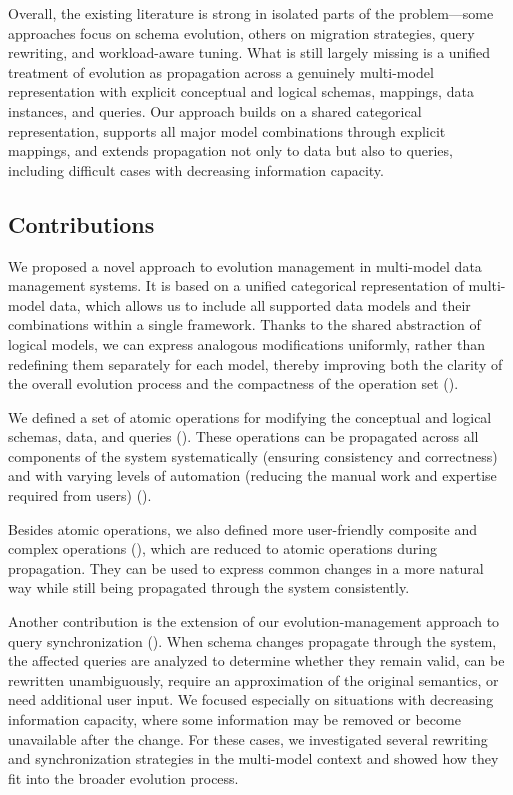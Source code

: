 Overall, the existing literature is strong in isolated parts of the problem---some approaches focus on schema evolution, others on migration strategies, query rewriting, and workload-aware tuning. What is still largely missing is a unified treatment of evolution as propagation across a genuinely multi-model representation with explicit conceptual and logical schemas, mappings, data instances, and queries. Our approach builds on a shared categorical representation, supports all major model combinations through explicit mappings, and extends propagation not only to data but also to queries, including difficult cases with decreasing information capacity.

\subsection{Contributions}

We proposed a novel approach to evolution management in multi-model data management systems. It is based on a unified categorical representation of multi-model data, which allows us to include all supported data models and their combinations within a single framework. Thanks to the shared abstraction of logical models, we can express analogous modifications uniformly, rather than redefining them separately for each model, thereby improving both the clarity of the overall evolution process and the compactness of the operation set ().

We defined a set of atomic operations for modifying the conceptual and logical schemas, data, and queries (). These operations can be propagated across all components of the system systematically (ensuring consistency and correctness) and with varying levels of automation (reducing the manual work and expertise required from users) ().

Besides atomic operations, we also defined more user-friendly composite and complex operations (), which are reduced to atomic operations during propagation. They can be used to express common changes in a more natural way while still being propagated through the system consistently.

Another contribution is the extension of our evolution-management approach to query synchronization (). When schema changes propagate through the system, the affected queries are analyzed to determine whether they remain valid, can be rewritten unambiguously, require an approximation of the original semantics, or need additional user input. We focused especially on situations with decreasing information capacity, where some information may be removed or become unavailable after the change. For these cases, we investigated several rewriting and synchronization strategies in the multi-model context and showed how they fit into the broader evolution process.

